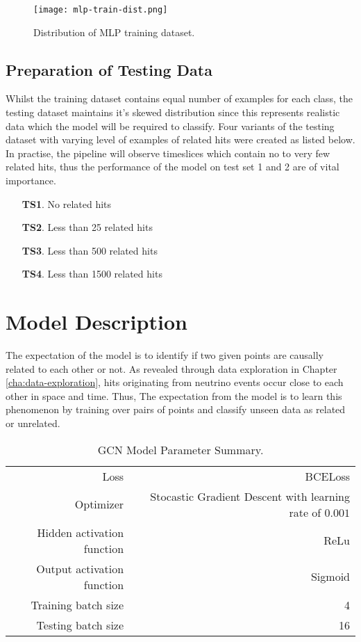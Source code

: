  \begin{figure}[h]
   \centering
   \caption{Distribution of MLP training dataset.}
   \texttt{[image: mlp-train-dist.png]}
   \label{fig:mlp-train-dist}
 \end{figure}

\subsection{Preparation of Testing Data}
\label{sec:mlp-data-prep-test}

Whilst the training dataset contains equal number of examples for each
class, the testing dataset maintains it's skewed distribution since
this represents realistic data which the model will be required to
classify. Four variants of the testing dataset with varying level of
examples of related hits were created as listed below. In practise,
the pipeline will observe timeslices which contain no to very few
related hits, thus the performance of the model on test set 1 and 2
are of vital importance.

\begin{enumerate}
\item[\textbf{TS1}.] No related hits
\item[\textbf{TS2}.] Less than 25 related hits
\item[\textbf{TS3}.] Less than 500 related hits
\item[\textbf{TS4}.] Less than 1500 related hits
\end{enumerate}

\section{Model Description}
\label{sec:mlp-model-desc}

The expectation of the model is to identify if two given points are
causally related to each other or not. As revealed through data
exploration in Chapter \ref{cha:data-exploration}, hits originating from
neutrino events occur close to each other in space and time. Thus, The
expectation from the model is to learn this phenomenon by training
over pairs of points and classify unseen data as related or unrelated.

\begin{table}[t]
  \centering
  \begin{tabular}{rr}
    \hline
    Loss & BCELoss \\
    Optimizer & Stocastic Gradient Descent with learning rate of $0.001$ \\
    Hidden activation function & ReLu \\
    Output activation function & Sigmoid \\
    Training batch size & 4 \\
    Testing batch size & 16 \\
    \hline
  \end{tabular}
  \caption{GCN Model Parameter Summary.}
  \label{tab:gcn-model-param}
\end{table}

